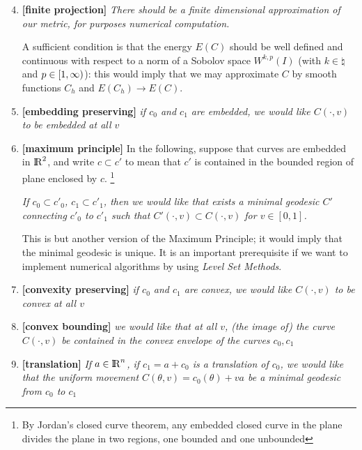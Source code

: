 \documentclass[twoside,a4paper,english]{article}
\begin{document}
\begin{enumerate}
\setcounter{enumi}{3}
\item{\bf[finite projection]}
   \emph{There should be a finite dimensional approximation of our metric,
    for purposes  numerical computation.}

  A sufficient condition is that the energy $E(C)$ should be well defined and
  continuous with respect to a norm of a Sobolov space $W^{k,p}(I)$
  (with $k\in\natural$ and $p\in [1,\infty)$):
  this would imply that we may approximate $C$ by smooth functions $C_h$
  and $E(C_h)\to E(C)$.


\item{\bf[embedding preserving]}
  \emph{ if $c_0$ and $c_1$ are embedded, we would like $C(\cdot,v)$
    to be embedded at all $v$}

\item{\bf[maximum principle]}
  In the following, suppose that curves are embedded in ${\protect\mathrm{l\hskip-0.15em R}}^2$, and
  write $c\subset c'$ to mean that $c'$ is contained in the bounded
  region of plane enclosed by $c$.%
  \footnote{By Jordan's closed curve theorem, any embedded closed
  curve in the plane divides the plane in two regions, one bounded and
  one unbounded}

  \emph{ If $c_0\subset c'_0$, $c_1\subset c'_1$, 
    then we would like that exists   
    a minimal geodesic $C'$ connecting $c'_0$ to $c'_1$ such that
    $C'(\cdot,v)\subset C(\cdot,v)$ for $v\in[0,1]$.    }
    
    This is but another version of the Maximum Principle;
    it would imply that the minimal geodesic is unique. 
    It is an important prerequisite if we want to implement
    numerical algorithms by using \emph{Level Set Methods}.


\item{\bf{[convexity preserving]}}
  \emph{ if $c_0$ and $c_1$ are convex, we would like $C(\cdot,v)$
    to be convex at all $v$}

\item{\bf{[convex bounding]}}
  \emph{ 
    we would like that at all $v$, (the image of) the curve
  $C(\cdot,v)$
  be contained in the convex envelope of the curves $c_0,c_1$
  }

\item{\bf[translation]}
  \emph{ If $a\in{\protect\mathrm{l\hskip-0.15em R}}^n$, 
    if $c_1=a+c_0$ is a translation of  $c_0$, we would like that 
   the uniform movement $C(\theta,v)=c_0(\theta)+va$ be
    a minimal geodesic from $c_0$ to $c_1$}



\end{enumerate}
\end{document}
